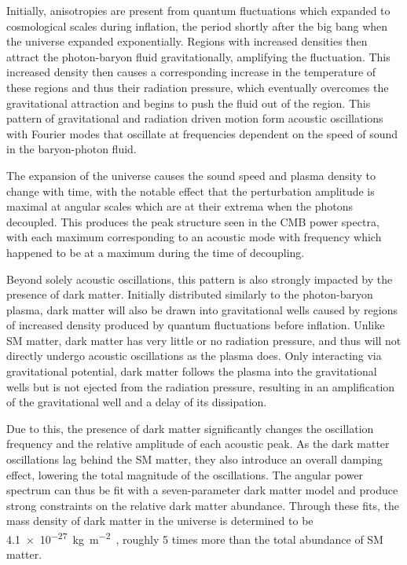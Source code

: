 Initially, anisotropies are present from quantum fluctuations which expanded to cosmological scales during inflation, the period shortly after the big bang when the universe expanded exponentially.
Regions with increased densities then attract the photon-baryon fluid gravitationally, amplifying the fluctuation.
This increased density then causes a corresponding increase in the temperature of these regions and thus their radiation pressure, which eventually overcomes the gravitational attraction and begins to push the fluid out of the region. 
This pattern of gravitational and radiation driven motion form acoustic oscillations with Fourier modes that oscillate at frequencies dependent on the speed of sound in the baryon-photon fluid.

The expansion of the universe causes the sound speed and plasma density to change with time, with the notable effect that the perturbation amplitude is maximal at angular scales which are at their extrema when the photons decoupled. 
This produces the peak structure seen in the CMB power spectra, with each maximum corresponding to an acoustic mode with frequency which happened to be at a maximum during the time of decoupling.

Beyond solely acoustic oscillations, this pattern is also strongly impacted by the presence of dark matter.
Initially distributed similarly to the photon-baryon plasma, dark matter will also be drawn into gravitational wells caused by regions of increased density produced by quantum fluctuations before inflation.
Unlike SM matter, dark matter has very little or no radiation pressure, and thus will not directly undergo acoustic oscillations as the plasma does. 
Only interacting via gravitational potential, dark matter follows the plasma into the gravitational wells but is not ejected from the radiation pressure, resulting in an amplification of the gravitational well and a delay of its dissipation. 

Due to this, the presence of dark matter significantly changes the oscillation frequency and the relative amplitude of each acoustic peak.
As the dark matter oscillations lag behind the SM matter, they also introduce an overall damping effect, lowering the total magnitude of the oscillations.
The angular power spectrum can thus be fit with a seven-parameter dark matter model and produce strong constraints on the relative dark matter abundance.
Through these fits, the mass density of dark matter in the universe is determined to be \SI{4.1e-27}{\kilo\gram\per\meter\squared}~\cite{PlanckCMB}, roughly 5 times more than the total abundance of SM matter.


